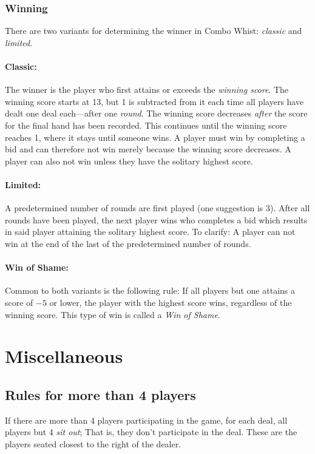 \documentclass[a4paper]{article} %
\begin{document}
	\subsubsection{Winning}
	\label{sec:winning}
	There are two variants for determining the winner in Combo Whist: \emph{classic} and \emph{limited}.

	\paragraph{Classic:}
	The winner is the player who first attains or exceeds the \emph{winning score}. The winning score starts at 13, but 1 is subtracted from it each time all players have dealt one deal each---after one \emph{round}. The winning score decreases \emph{after} the score for the final hand has been recorded. This continues until the winning score reaches 1, where it stays until someone wins. A player must win by completing a bid and can therefore not win merely because the winning score decreases. A player can also not win unless they have the solitary highest score.

	\paragraph{Limited:}
	A predetermined number of rounds are first played (one suggestion is 3). After all rounds have been played, the next player wins who completes a bid which results in said player attaining the solitary highest score. To clarify: A player can not win at the end of the last of the predetermined number of rounds.

	\paragraph{Win of Shame:}
	Common to both variants is the following rule: If all players but one attains a score of $-5$ or lower, the player with the highest score wins, regardless of the winning score. This type of win is called a \emph{Win of Shame}.

	\section{Miscellaneous}
	\subsection{Rules for more than 4 players}
	If there are more than 4 players participating in the game, for each deal, all players but 4 \emph{sit out}; That is, they don't participate in the deal. These are the players seated closest to the right of the dealer.
		
\end{document}
